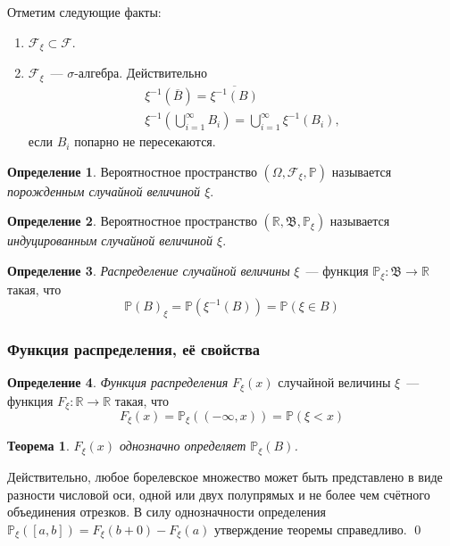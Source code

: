\documentclass[oneside,final,14pt]{extreport}
\newcommand\myprob[1]{{\mathbb{P}(#1)}}
\renewenvironment{proof}{{\bfseries Доказательство.}}{\qed}
\newtheorem{thm}{Теорема}[section]
\theoremstyle{definition}
\newtheorem{defn}{Определение}[section]
\begin{document}
Отметим следующие факты:
\begin{enumerate}
    \item $\mathcal{F}_\xi \subset \mathcal{F}.$
    \item $\mathcal{F}_\xi$~--- $\sigma$-алгебра. Действительно
    \begin{gather*}
        \xi^{-1}(\overline{B}) = \overline{\xi^{-1}(B)} \\
        \xi^{-1}\left(\bigcup\limits_{i=1}^{\infty}B_i\right) = \bigcup\limits_{i=1}^\infty \xi^{-1}(B_i),
    \end{gather*}
   если $B_i$ попарно не пересекаются.
\end{enumerate}

\begin{defn}
    Вероятностное пространство $(\Omega,\mathcal{F}_\xi,\mathbb{P})$ называется {\it порожденным случайной величиной $\xi$}.
\end{defn}

\begin{defn}
    Вероятностное пространство $(\mathbb{R}, \mathfrak{B}, \mathbb{P}_\xi)$ называется {\it индуцированным случайной величиной $\xi$}.
\end{defn}

\begin{defn}
    {\it Распределение случайной величины} $\xi$~--- функция $\mathbb{P}_\xi: \mathfrak{B} \rightarrow \mathbb{R}$ такая, что
    \begin{equation*}
        \myprob{B}_\xi = \myprob{\xi^{-1}(B)} = \myprob{\xi \in B}
    \end{equation*}
\end{defn}
\subsubsection{Функция распределения, её свойства}
\begin{defn}
    {\it Функция распределения} $F_\xi (x)$ случайной величины $\xi$~--- функция $F_\xi: \mathbb{R} \rightarrow \mathbb{R}$ такая, что
    \begin{equation*}
        F_{\xi}(x)=\mathbb{P}_{\xi}((-\infty, x))=\mathbb{P}(\xi<x)
    \end{equation*}
\end{defn}

\begin{thm}
    $F_\xi(x)$ однозначно определяет $\mathbb{P}_\xi(B)$.
\end{thm}
\begin{proof}
    Действительно, любое борелевское множество может быть представлено в виде разности числовой оси, одной или двух полупрямых и не более чем счётного объединения отрезков. В силу однозначности определения $\mathbb{P}_\xi([a,b]) = F_\xi(b + 0) - F_\xi(a)$ утверждение теоремы справедливо.
\end{proof}
\end{document}

